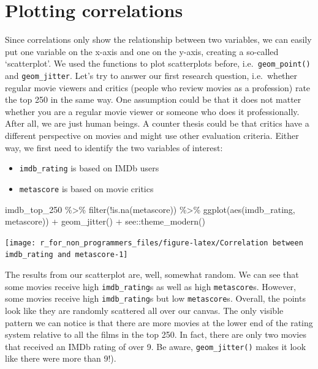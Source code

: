 \documentclass[
]{book}
\newenvironment{Shaded}{\begin{snugshade}}{\end{snugshade}}
\newcommand{\FunctionTok}[1]{\textcolor[rgb]{0.00,0.00,0.00}{#1}}
\newcommand{\NormalTok}[1]{#1}
\newcommand{\SpecialCharTok}[1]{\textcolor[rgb]{0.00,0.00,0.00}{#1}}
\begin{document}
\hypertarget{plotting-correlations}{%
\section{Plotting correlations}\label{plotting-correlations}}

Since correlations only show the relationship between two variables, we can easily put one variable on the x-axis and one on the y-axis, creating a so-called `scatterplot'. We used the functions to plot scatterplots before, i.e.~\texttt{geom\_point()} and \texttt{geom\_jitter}. Let's try to answer our first research question, i.e.~whether regular movie viewers and critics (people who review movies as a profession) rate the top 250 in the same way. One assumption could be that it does not matter whether you are a regular movie viewer or someone who does it professionally. After all, we are just human beings. A counter thesis could be that critics have a different perspective on movies and might use other evaluation criteria. Either way, we first need to identify the two variables of interest:

\begin{itemize}
\item
  \texttt{imdb\_rating} is based on IMDb users
\item
  \texttt{metascore} is based on movie critics
\end{itemize}

\begin{Shaded}
\begin{Highlighting}[]
\NormalTok{imdb\_top\_250 }\SpecialCharTok{\%\textgreater{}\%}
  \FunctionTok{filter}\NormalTok{(}\SpecialCharTok{!}\FunctionTok{is.na}\NormalTok{(metascore)) }\SpecialCharTok{\%\textgreater{}\%} 
  \FunctionTok{ggplot}\NormalTok{(}\FunctionTok{aes}\NormalTok{(imdb\_rating, metascore)) }\SpecialCharTok{+}
  \FunctionTok{geom\_jitter}\NormalTok{() }\SpecialCharTok{+}
\NormalTok{  see}\SpecialCharTok{::}\FunctionTok{theme\_modern}\NormalTok{()}
\end{Highlighting}
\end{Shaded}

\begin{center}\texttt{[image: r\_for\_non\_programmers\_files/figure-latex/Correlation between imdb\_rating and metascore-1]} \end{center}

The results from our scatterplot are, well, somewhat random. We can see that some movies receive high \texttt{imdb\_rating}s as well as high \texttt{metascore}s. However, some movies receive high \texttt{imdb\_rating}s but low \texttt{metascore}s. Overall, the points look like they are randomly scattered all over our canvas. The only visible pattern we can notice is that there are more movies at the lower end of the rating system relative to all the films in the top 250. In fact, there are only two movies that received an IMDb rating of over 9. Be aware, \texttt{geom\_jitter()} makes it look like there were more than 9!).
\end{document}
